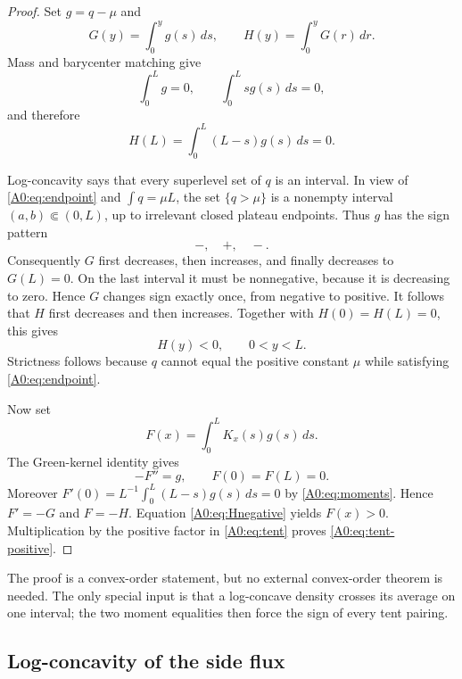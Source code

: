 \begin{proof}
Set \(g=q-\mu\) and
\begin{equation}
 G(y)=\int_0^yg(s)\,ds,\qquad
 H(y)=\int_0^yG(r)\,dr.
\end{equation}
Mass and barycenter matching give
\begin{equation}\label{A0:eq:moments}
 \int_0^Lg=0,\qquad \int_0^Lsg(s)\,ds=0,
\end{equation}
and therefore
\begin{equation}\label{A0:eq:Hend}
 H(L)=\int_0^L(L-s)g(s)\,ds=0.
\end{equation}

Log-concavity says that every superlevel set of \(q\) is an interval.
In view of \eqref{A0:eq:endpoint} and \(\int q=\mu L\), the set
\(\{q>\mu\}\) is a nonempty interval \((a,b)\Subset(0,L)\), up to
irrelevant closed plateau endpoints.  Thus \(g\) has the sign pattern
\[
 -,\quad +,\quad -.
\]
Consequently \(G\) first decreases, then increases, and finally decreases
to \(G(L)=0\).  On the last interval it must be nonnegative, because it is
decreasing to zero.  Hence \(G\) changes sign exactly once, from negative
to positive.  It follows that \(H\) first decreases and then increases.
Together with \(H(0)=H(L)=0\), this gives
\begin{equation}\label{A0:eq:Hnegative}
 H(y)<0,\qquad 0<y<L.
\end{equation}
Strictness follows because \(q\) cannot equal the positive constant
\(\mu\) while satisfying \eqref{A0:eq:endpoint}.

Now set
\[
 F(x)=\int_0^LK_x(s)g(s)\,ds.
\]
The Green-kernel identity gives
\[
 -F''=g,\qquad F(0)=F(L)=0.
\]
Moreover \(F'(0)=L^{-1}\int_0^L(L-s)g(s)\,ds=0\) by
\eqref{A0:eq:moments}.  Hence \(F'=-G\) and \(F=-H\).  Equation
\eqref{A0:eq:Hnegative} yields \(F(x)>0\).  Multiplication by the positive
factor in \eqref{A0:eq:tent} proves \eqref{A0:eq:tent-positive}.
\end{proof}

\begin{remark}
The proof is a convex-order statement, but no external convex-order
theorem is needed.  The only special input is that a log-concave density
crosses its average on one interval; the two moment equalities then force
the sign of every tent pairing.
\end{remark}

\subsection{Log-concavity of the side flux}


